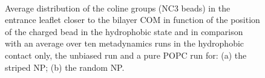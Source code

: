 \begin{figure}[!bh]
	\center
	\\%
	\caption{Average distribution of the coline groups (NC3 beads) in the entrance leaflet closer to the bilayer \acs{COM} in function of the position of the charged bead in the hydrophobic state and in comparison with an average over ten metadynamics runs in the hydrophobic contact only, the unbiased run and a pure \acs{POPC} run for: (a) the striped \acs{NP}; (b) the random \acs{NP}.}
	\label{fig:NC3minDistUn}
\end{figure}

